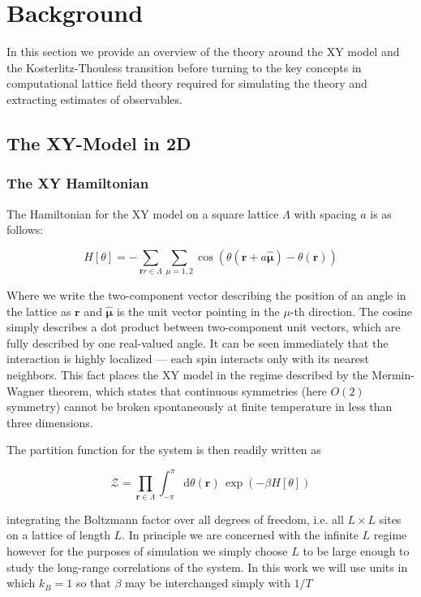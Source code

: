\documentclass[12pt]{article}
\begin{document}
\section{Background}

In this section we provide an overview of the theory around the XY model and the Kosterlitz-Thouless transition before turning to the key concepts in computational
lattice field theory required for simulating the theory and extracting estimates of observables.

\subsection{The XY-Model in 2D}

\subsubsection{The XY Hamiltonian}

The Hamiltonian for the XY model on a square lattice $\Lambda$ with spacing $a$ is as follows:

\begin{equation*}
	H[\theta] = -\sum_{\mathbf{r}r\in\Lambda}\sum_{\mu=1,2}\cos(\theta(\mathbf{r}+a\hat{\pmb{\mu}})-\theta(\mathbf{\mathbf{r}}))
\end{equation*}

Where we write the two-component vector describing the position of an angle in the lattice as $\mathbf{r}$ and $\hat{\mathbf{\mu}}$ is the unit vector
pointing in the $\mu$-th direction. The cosine simply describes a dot product between two-component unit vectors, which are fully described by one
real-valued angle. It can be seen immediately that the interaction is highly localized --- each spin interacts only with its nearest neighbors. This fact places
the XY model in the regime described by the Mermin-Wagner theorem, which states that continuous symmetries (here $O(2)$ symmetry) cannot
be broken spontaneously at finite temperature in less than three dimensions.

The partition function for the system is then readily written as

\begin{equation} \label{eq:partition}
	\mathcal{Z} = \prod_{\mathbf{r}\in\Lambda}\int_{-\pi}^{\pi}\mathrm{d}\theta(\mathbf{r})\,\exp\left(-\beta H[\theta] \right)
\end{equation}

integrating the Boltzmann factor over all degrees of freedom, i.e. all $L\times L$ sites on a lattice of length $L$. In principle we are concerned with the infinite $L$ regime
however for the purposes of simulation we simply choose $L$ to be large enough to study the long-range correlations of the system. In this work we will use
units in which $k_B=1$ so that $\beta$ may be interchanged simply with $1/T$
\end{document}

